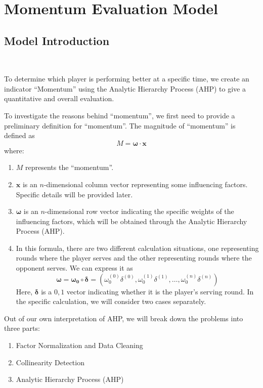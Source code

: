 \section{Momentum Evaluation Model}

\subsection{Model Introduction}~{}

To determine which player is performing better at a specific time, we create an indicator ``Momentum'' 
using the Analytic Hierarchy Process (AHP) \cite{AHP}to give a quantitative and overall evaluation.

\indent To investigate the reasons behind ``momentum'', we first need to provide a preliminary definition for ``momentum''. The magnitude of ``momentum'' is defined as 
$$M=\boldsymbol{\omega}\cdot\boldsymbol{x}$$
where:
\begin{enumerate}
    \item $M$ represents the ``momentum''.
    \item $\boldsymbol{x}$ is an $n$-dimensional column vector representing some influencing factors. Specific details will be provided later.
    \item $\boldsymbol{\omega}$ is an $n$-dimensional row vector indicating the specific weights of the influencing factors, which will be obtained through the Analytic Hierarchy Process (AHP).
    \item In this formula, there are two different calculation situations, one representing rounds where the player serves and the other representing rounds where the opponent serves. We can express it as $$\boldsymbol{\omega}=\boldsymbol{\omega_0} \circ \boldsymbol{\delta}=(\omega_0^{(0)}\delta^{(0)},\omega_0^{(1)}\delta^{(1)},\dots,\omega_0^{(n)}\delta^{(n)})$$  Here, $\boldsymbol{\delta}$ is a $0,1$ vector indicating whether it is the player's serving round. In the specific calculation, we will consider two cases separately.
\end{enumerate}

Out of our own interpretation of AHP, we will break down the problems into three parts:

\begin{enumerate}
    \item Factor Normalization and Data Cleaning
    \item Collinearity Detection
    \item Analytic Hierarchy Process (AHP)
\end{enumerate}

